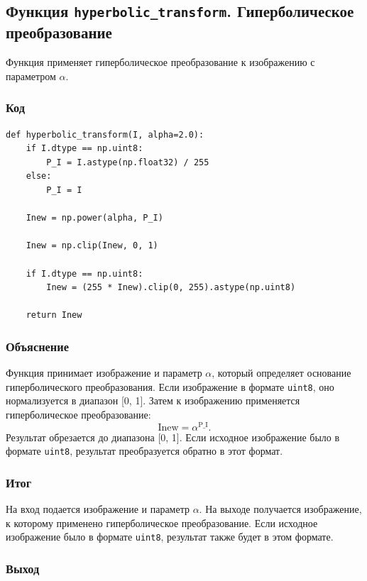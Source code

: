 \documentclass[a4paper,12pt]{article}
\begin{document}
\subsection{Функция \texttt{hyperbolic\_transform}. Гиперболическое преобразование}

Функция применяет гиперболическое преобразование к изображению с параметром \( \alpha \).

\subsubsection{Код}
\begin{verbatim}
def hyperbolic_transform(I, alpha=2.0):
    if I.dtype == np.uint8:
        P_I = I.astype(np.float32) / 255
    else:
        P_I = I

    Inew = np.power(alpha, P_I)

    Inew = np.clip(Inew, 0, 1)

    if I.dtype == np.uint8:
        Inew = (255 * Inew).clip(0, 255).astype(np.uint8)
    
    return Inew
\end{verbatim}

\subsubsection{Объяснение}
Функция принимает изображение и параметр \( \alpha \), который определяет основание гиперболического преобразования. Если изображение в формате \texttt{uint8}, оно нормализуется в диапазон [0, 1]. Затем к изображению применяется гиперболическое преобразование:
\[
\text{Inew} = \alpha^{\text{P\_I}}.
\]
Результат обрезается до диапазона [0, 1]. Если исходное изображение было в формате \texttt{uint8}, результат преобразуется обратно в этот формат.

\subsubsection{Итог}
На вход подается изображение и параметр \( \alpha \). На выходе получается изображение, к которому применено гиперболическое преобразование. Если исходное изображение было в формате \texttt{uint8}, результат также будет в этом формате.

\subsubsection{Выход}
\end{document}
